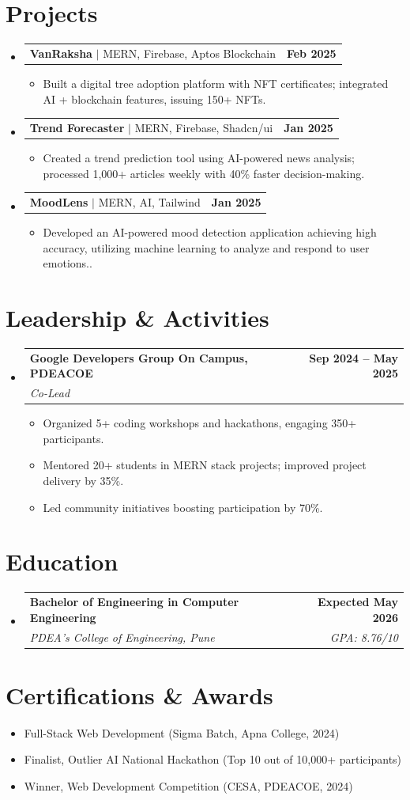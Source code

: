 \documentclass[letterpaper,11pt]{article}
\makeatletter
\newcommand{\resumeItem}[1]{\item\small{{#1 \vspace{-2pt}}}}
\newcommand{\resumeSubheading}[4]{
  \vspace{-2pt}\item
    \begin{tabular*}{1.0\textwidth}[t]{l@{\extracolsep{\fill}}r}
      \textbf{#1} & \textbf{\small #2} \\
      \textit{\small#3} & \textit{\small #4} \\
    \end{tabular*}\vspace{-6pt}
}
\newcommand{\resumeProjectHeading}[2]{
    \item
    \begin{tabular*}{1.001\textwidth}{l@{\extracolsep{\fill}}r}
      \small#1 & \textbf{\small #2}\\
    \end{tabular*}\vspace{-6pt}
}
\newcommand{\resumeItemListStart}{\begin{itemize}}
\newcommand{\resumeItemListEnd}{\end{itemize}\vspace{-5pt}}
\newcommand{\resumeSubHeadingListStart}{\begin{itemize}[leftmargin=0.0in, label={}]}
\newcommand{\resumeSubHeadingListEnd}{\end{itemize}}
\makeatother
\begin{document}
\section{Projects}
\resumeSubHeadingListStart
  \resumeProjectHeading
      {\textbf{VanRaksha} $|$ MERN, Firebase, Aptos Blockchain}{Feb 2025}
      \resumeItemListStart
        \resumeItem{Built a digital tree adoption platform with NFT certificates; integrated AI + blockchain features, issuing 150+ NFTs.}
      \resumeItemListEnd

  \resumeProjectHeading
      {\textbf{Trend Forecaster} $|$ MERN, Firebase, Shadcn/ui}{Jan 2025}
      \resumeItemListStart
        \resumeItem{Created a trend prediction tool using AI-powered news analysis; processed 1,000+ articles weekly with 40\% faster decision-making.}
      \resumeItemListEnd

  \resumeProjectHeading
      {\textbf{MoodLens} $|$ MERN, AI, Tailwind}{Jan 2025}
      \resumeItemListStart
        \resumeItem{Developed an AI-powered mood detection application achieving high accuracy, utilizing machine learning to analyze and respond to user emotions..}
      \resumeItemListEnd
\resumeSubHeadingListEnd

\section{Leadership \& Activities}
\resumeSubHeadingListStart
  \resumeSubheading
    {Google Developers Group On Campus, PDEACOE}{Sep 2024 -- May 2025}
    {Co-Lead}{}
    \resumeItemListStart
      \resumeItem{Organized 5+ coding workshops and hackathons, engaging 350+ participants.}
      \resumeItem{Mentored 20+ students in MERN stack projects; improved project delivery by 35\%.}
      \resumeItem{Led community initiatives boosting participation by 70\%.}
    \resumeItemListEnd
\resumeSubHeadingListEnd

\section{Education}
\resumeSubHeadingListStart
  \resumeSubheading
    {Bachelor of Engineering in Computer Engineering}{Expected May 2026}
    {PDEA's College of Engineering, Pune}{GPA: 8.76/10}
\resumeSubHeadingListEnd

\section{Certifications \& Awards}
\resumeItemListStart
  \resumeItem{Full-Stack Web Development (Sigma Batch, Apna College, 2024)}
  \resumeItem{Finalist, Outlier AI National Hackathon (Top 10 out of 10,000+ participants)}
  \resumeItem{Winner, Web Development Competition (CESA, PDEACOE, 2024)}
\resumeItemListEnd
\end{document}
